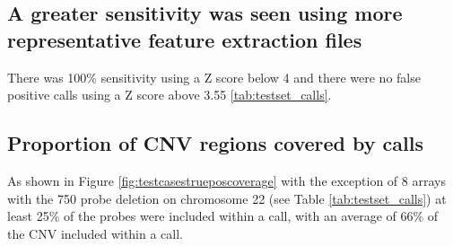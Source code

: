\subsection{A greater sensitivity was seen using more representative feature extraction files}
There was 100\% sensitivity using a Z score below 4 and there were no false positive calls using a Z score above 3.55 \ref{tab:testset_calls}. 


\begin{table}[]
\centering
\caption[Test cases: Calls made at a range of thresholds]{Test cases: A call was made in the expected CNV region in all cases with a threshold below 4. There were no false positive calls made with a threshold above 3.55}
\label{tab:testcasetable}
\end{table}

\subsection{Proportion of CNV regions covered by calls}
As shown in Figure \ref{fig:testcasestrueposcoverage} with the exception of 8 arrays with the 750 probe deletion on chromosome 22 (see Table \ref{tab:testset_calls}) at least 25\% of the probes were included within a call, with an average of 66\% of the CNV included within a call.

